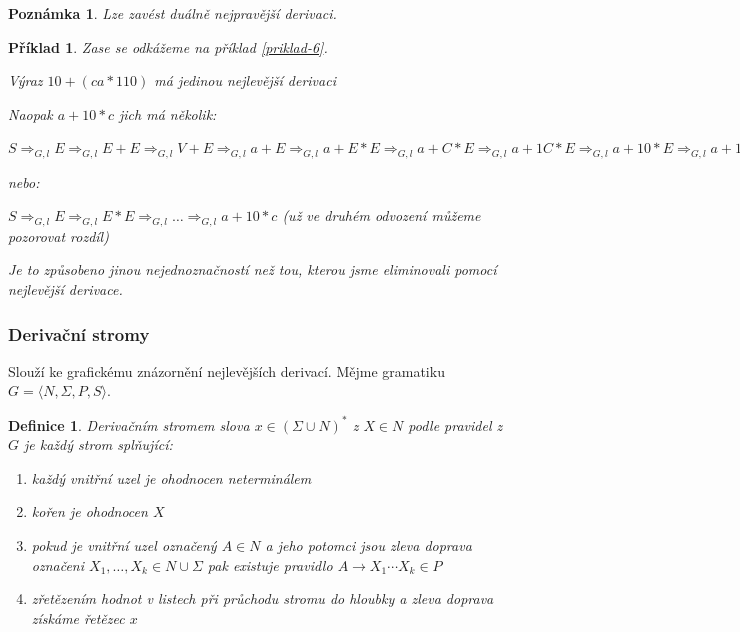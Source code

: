 \documentclass[10pt,a4paper]{article}
\theoremstyle{note}
\newtheorem{definice}{Definice}
\newtheorem{priklad}{Příklad}
\newtheorem{poznamka}{Poznámka}
\begin{document}
\begin{poznamka}
Lze zavést duálně nejpravější derivaci.
\end{poznamka}

\begin{priklad}
Zase se odkážeme na příklad \ref{priklad-6}.

Výraz $10+(ca*110)$ má jedinou nejlevější derivaci

Naopak $a+10*c$ jich má několik:

$S \Rightarrow_{G,l} E \Rightarrow_{G,l} E+E \Rightarrow_{G,l} V+E \Rightarrow_{G,l} a+E \Rightarrow_{G,l} a+E*E \Rightarrow_{G,l} a+C*E \Rightarrow_{G,l} a+1C*E \Rightarrow_{G,l} a+10*E \Rightarrow_{G,l} a+10*V \Rightarrow_{G,l} a+10*c$

nebo:

$S \Rightarrow_{G,l} E \Rightarrow_{G,l} E*E \Rightarrow_{G,l} \ldots \Rightarrow_{G,l} a+10*c$ (už ve druhém odvození můžeme pozorovat rozdíl)

Je to způsobeno jinou nejednoznačností než tou, kterou jsme eliminovali pomocí nejlevější derivace.
\end{priklad}

\subsubsection{Derivační stromy}

Slouží ke grafickému znázornění nejlevějších derivací. Mějme gramatiku $G = \langle N,\Sigma,P,S \rangle$.

\begin{definice}
Derivačním stromem slova $x \in (\Sigma \cup N)^*$ z $X \in N$ podle pravidel z $G$ je každý strom splňující:
\begin{enumerate}
\item 
každý vnitřní uzel je ohodnocen neterminálem
\item
kořen je ohodnocen $X$
\item
pokud je vnitřní uzel označený $A\in N $ a jeho potomci jsou zleva doprava označeni $X_1,\ldots,X_k \in N\cup \Sigma$ pak existuje pravidlo $A \rightarrow X_1 \cdots X_k \in P$
\item
zřetězením hodnot v listech při průchodu stromu do hloubky a zleva doprava získáme řetězec $x$
\end{enumerate}
\end{definice}
\end{document}
